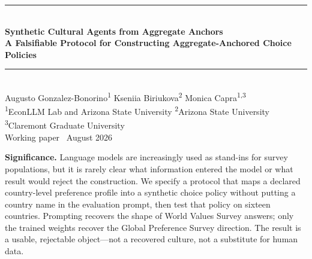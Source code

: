 \documentclass[10pt,letterpaper]{article}
\begin{document}
\thispagestyle{empty}
\begin{center}
\vspace*{0.65cm}
{\color{econblue}\rule{\textwidth}{1.1pt}}\\[0.45em]
{\LARGE\bfseries\color{econblue} Synthetic Cultural Agents from Aggregate Anchors}\\[0.22em]
{\large\bfseries A Falsifiable Protocol for Constructing Aggregate-Anchored Choice Policies}\\[0.42em]
{\color{econblue}\rule{\textwidth}{0.5pt}}\\[0.7em]
{\large Augusto Gonzalez-Bonorino\textsuperscript{1} \quad Kseniia Biriukova\textsuperscript{2} \quad Monica Capra\textsuperscript{1,3}}\\[0.42em]
{\small \textsuperscript{1}EconLLM Lab and Arizona State University \quad
\textsuperscript{2}Arizona State University \quad
\textsuperscript{3}Claremont Graduate University}\\[0.55em]
{\normalsize Working paper \textperiodcentered\ August 2026}
\end{center}

\vspace{0.35em}

\vspace{0.45em}
\noindent\colorbox{mist}{\parbox{0.965\textwidth}{\small\vspace{0.25em}
\textbf{Significance.} Language models are increasingly used as stand-ins for survey populations, but it is rarely clear what information entered the model or what result would reject the construction. We specify a protocol that maps a declared country-level preference profile into a synthetic choice policy without putting a country name in the evaluation prompt, then test that policy on sixteen countries. Prompting recovers the shape of World Values Survey answers; only the trained weights recover the Global Preference Survey direction. The result is a usable, rejectable object---not a recovered culture, not a substitute for human data.\vspace{0.25em}}}
\end{document}
